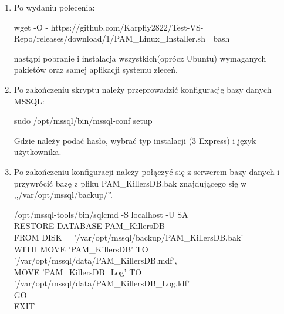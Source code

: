 \documentclass[12pt,a4paper]{article}
\begin{document}
			\begin{enumerate}
				\item Po wydaniu polecenia:
					\begin{tcolorbox}[minipage,colback=white,arc=0pt,outer arc=0pt, fontupper=\scriptsize]
						wget -O - https://github.com/Karpfly2822/Test-VS-Repo/releases/download/1/PAM\_Linux\_Installer.sh $|$ bash
					\end{tcolorbox}			
					nastąpi pobranie i instalacja wszystkich(oprócz Ubuntu) wymaganych pakietów oraz samej aplikacji systemu zleceń.
			
				\item Po zakończeniu skryptu należy przeprowadzić konfigurację bazy danych MSSQL:
					\begin{tcolorbox}[minipage,colback=white,arc=0pt,outer arc=0pt, fontupper=\footnotesize]			
						sudo /opt/mssql/bin/mssql-conf setup
					\end{tcolorbox}
					Gdzie należy podać hasło, wybrać typ instalacji (3 Express) i język użytkownika.
					
				\item Po zakończeniu konfiguracji należy połączyć się z serwerem bazy danych i przywrócić bazę z pliku
					PAM\_KillersDB.bak znajdującego się w ,,/var/opt/mssql/backup/''.	
					\begin{tcolorbox}[minipage,colback=white,arc=0pt,outer arc=0pt, fontupper=\footnotesize]			
						/opt/mssql-tools/bin/sqlcmd -S localhost -U SA \\
						RESTORE DATABASE PAM\_KillersDB	\\
						FROM DISK = '/var/opt/mssql/backup/PAM\_KillersDB.bak'	\\
						WITH MOVE 'PAM\_KillersDB' TO '/var/opt/mssql/data/PAM\_KillersDB.mdf',	\\
						MOVE 'PAM\_KillersDB\_Log' TO '/var/opt/mssql/data/PAM\_KillersDB\_Log.ldf'	\\
						GO \\
						EXIT
					\end{tcolorbox}				
			

\end{enumerate}
\end{document}
